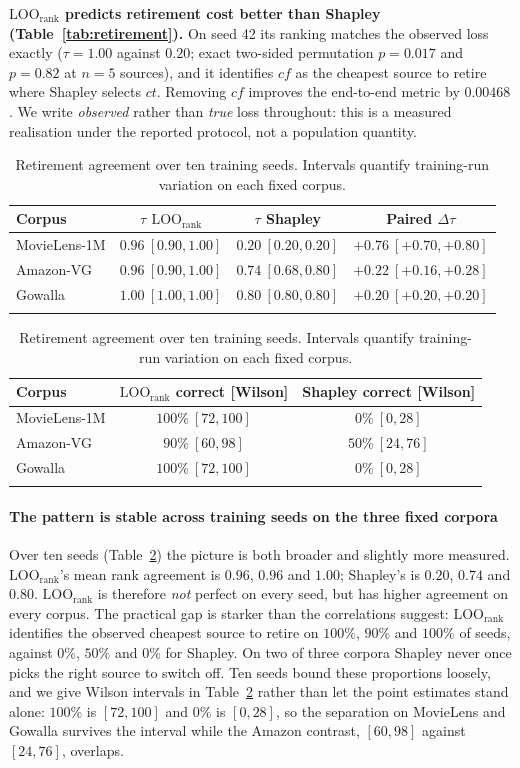 \documentclass[pdflatex,sn-basic,Numbered]{sn-jnl}
\theoremstyle{plain}
\theoremstyle{definition}
\newcommand{\LOOr}{\mathrm{LOO}_{\mathrm{rank}}}
\begin{document}
\textbf{$\LOOr$ predicts retirement cost better than Shapley
(Table~\ref{tab:retirement}).} On seed 42 its ranking matches the observed loss
exactly ($\tau = 1.00$ against $0.20$; exact two-sided permutation $p = 0.017$
and $p = 0.82$ at $n = 5$ sources), and it identifies $cf$ as the cheapest
source to retire where Shapley selects $ct$. Removing $cf$ improves the
end-to-end metric by $0.00468$. We write \emph{observed} rather
than \emph{true} loss throughout: this is a measured realisation under the
reported protocol, not a population quantity.

\begin{table}[tbp]
\caption{Retirement agreement over ten training seeds. Intervals quantify
training-run variation on each fixed corpus.}
\label{tab:retire-seeds}
\centering
\small
\begin{tabular}{@{}lccc@{}}
\toprule
Corpus & $\tau$ $\LOOr$ & $\tau$ Shapley & Paired $\Delta\tau$
       \\
\midrule
MovieLens-1M & $0.96\ [0.90, 1.00]$ & $0.20\ [0.20, 0.20]$
             & $+0.76\ [+0.70, +0.80]$ \\
Amazon-VG    & $0.96\ [0.90, 1.00]$ & $0.74\ [0.68, 0.80]$
             & $+0.22\ [+0.16, +0.28]$ \\
Gowalla      & $1.00\ [1.00, 1.00]$ & $0.80\ [0.80, 0.80]$
             & $+0.20\ [+0.20, +0.20]$ \\
\botrule
\end{tabular}

\smallskip
\begin{tabular}{@{}lcc@{}}
\toprule
Corpus & $\LOOr$ correct [Wilson] & Shapley correct [Wilson] \\
\midrule
MovieLens-1M & $100\%\ [72, 100]$ & $0\%\ [0, 28]$ \\
Amazon-VG    & $90\%\ [60, 98]$   & $50\%\ [24, 76]$ \\
Gowalla      & $100\%\ [72, 100]$ & $0\%\ [0, 28]$ \\
\botrule
\end{tabular}
\end{table}

\paragraph{The pattern is stable across training seeds on the three fixed corpora}
Over ten seeds (Table~\ref{tab:retire-seeds}) the picture is both broader and slightly
more measured. $\LOOr$'s mean rank agreement is $0.96$, $0.96$ and $1.00$;
Shapley's is $0.20$, $0.74$ and $0.80$. $\LOOr$ is therefore \emph{not} perfect on every
seed, but has higher agreement on every corpus. The practical gap is starker than the correlations
suggest: $\LOOr$ identifies the observed cheapest source to retire on $100\%$,
$90\%$ and $100\%$ of seeds, against $0\%$, $50\%$ and $0\%$ for Shapley. On two
of three corpora Shapley never once picks the right source to switch off. Ten
seeds bound these proportions loosely, and we give Wilson intervals in
Table~\ref{tab:retire-seeds} rather than let the point estimates stand alone:
$100\%$ is $[72, 100]$ and $0\%$ is $[0, 28]$, so the separation on MovieLens
and Gowalla survives the interval while the Amazon contrast, $[60, 98]$ against
$[24, 76]$, overlaps.
\end{document}
